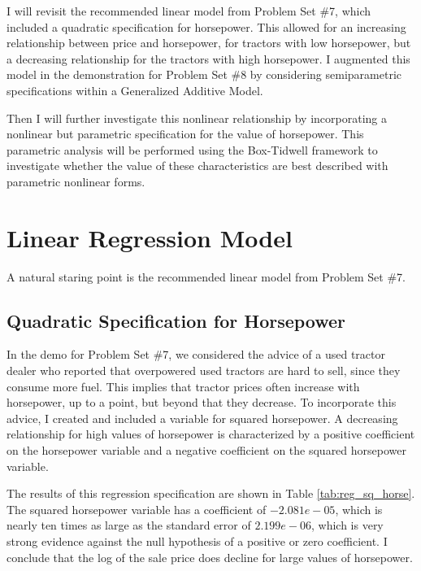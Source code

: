 I will revisit the recommended linear model
from Problem Set \#7, 
which included a quadratic specification for horsepower.
This allowed for an increasing relationship 
between price and horsepower, 
for tractors with low horsepower, 
but a decreasing relationship for the tractors with high horsepower. 
I augmented this model in the demonstration for 
Problem Set \#8 
by considering semiparametric specifications
within a Generalized Additive Model. 


Then I will further investigate this nonlinear relationship
by incorporating a nonlinear but parametric specification
for the value of horsepower. 
This parametric analysis will be performed
using the Box-Tidwell framework
to investigate whether the value of these characteristics
are best described with parametric nonlinear forms. 

\clearpage
\section{Linear Regression Model}

A natural staring point is the recommended linear model
from Problem Set \#7. 

\subsection{Quadratic Specification for Horsepower}

In the demo for Problem Set \#7, 
we considered the advice of
a used tractor dealer who reported that overpowered used tractors are hard to sell, since they consume more fuel. 
This implies that tractor prices often increase with horsepower, up to a point, but beyond that they decrease. 
To incorporate this advice, I created and included a variable for squared horsepower. 
A decreasing relationship for high values of horsepower
is characterized by 
a positive coefficient on the horsepower variable and
a negative coefficient on the squared horsepower variable. 

% 

% 
The results of this regression specification are shown in 
Table \ref{tab:reg_sq_horse}. 
%
The squared horsepower variable has a coefficient of $-2.081e-05$, which is nearly ten times as large as the standard error of $2.199e-06$, which is very strong evidence against the null hypothesis of a positive or zero coefficient. 
I conclude that the log of the sale price does decline for large values of horsepower. 


